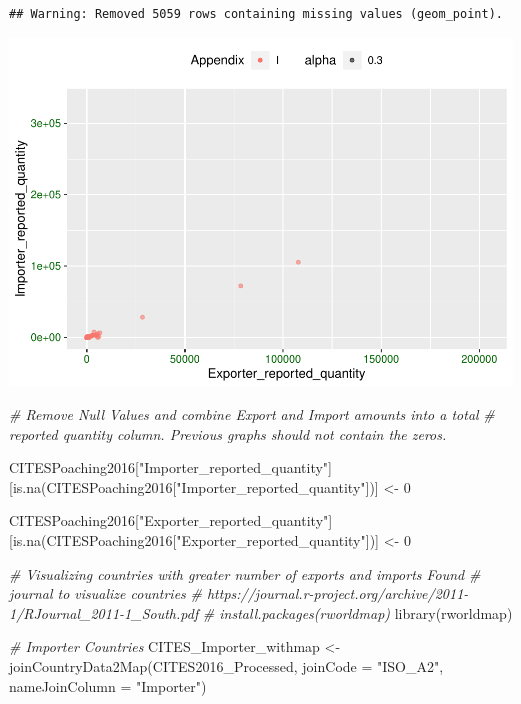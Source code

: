 \documentclass[
  12pt,
]{article}
\newenvironment{Shaded}{\begin{snugshade}}{\end{snugshade}}
\newcommand{\AttributeTok}[1]{\textcolor[rgb]{0.77,0.63,0.00}{#1}}
\newcommand{\CommentTok}[1]{\textcolor[rgb]{0.56,0.35,0.01}{\textit{#1}}}
\newcommand{\DecValTok}[1]{\textcolor[rgb]{0.00,0.00,0.81}{#1}}
\newcommand{\FunctionTok}[1]{\textcolor[rgb]{0.00,0.00,0.00}{#1}}
\newcommand{\NormalTok}[1]{#1}
\newcommand{\OtherTok}[1]{\textcolor[rgb]{0.56,0.35,0.01}{#1}}
\newcommand{\StringTok}[1]{\textcolor[rgb]{0.31,0.60,0.02}{#1}}
\begin{document}
\begin{verbatim}
## Warning: Removed 5059 rows containing missing values (geom_point).
\end{verbatim}

\includegraphics{Wood_ENV872_Project_files/figure-latex/unnamed-chunk-4-4.pdf}

\begin{Shaded}
\begin{Highlighting}[]
\CommentTok{\# Remove Null Values and combine Export and Import amounts into a total}
\CommentTok{\# reported quantity column. Previous graphs should not contain the zeros.}

\NormalTok{CITESPoaching2016[}\StringTok{"Importer\_reported\_quantity"}\NormalTok{][}\FunctionTok{is.na}\NormalTok{(CITESPoaching2016[}\StringTok{"Importer\_reported\_quantity"}\NormalTok{])] }\OtherTok{\textless{}{-}} \DecValTok{0}

\NormalTok{CITESPoaching2016[}\StringTok{"Exporter\_reported\_quantity"}\NormalTok{][}\FunctionTok{is.na}\NormalTok{(CITESPoaching2016[}\StringTok{"Exporter\_reported\_quantity"}\NormalTok{])] }\OtherTok{\textless{}{-}} \DecValTok{0}


\CommentTok{\# Visualizing countries with greater number of exports and imports Found}
\CommentTok{\# journal to visualize countries}
\CommentTok{\# https://journal.r{-}project.org/archive/2011{-}1/RJournal\_2011{-}1\_South.pdf}
\CommentTok{\# install.packages(\textquotesingle{}rworldmap\textquotesingle{})}
\FunctionTok{library}\NormalTok{(rworldmap)}

\CommentTok{\# Importer Countries}
\NormalTok{CITES\_Importer\_withmap }\OtherTok{\textless{}{-}} \FunctionTok{joinCountryData2Map}\NormalTok{(CITES2016\_Processed, }\AttributeTok{joinCode =} \StringTok{"ISO\_A2"}\NormalTok{,}
    \AttributeTok{nameJoinColumn =} \StringTok{"Importer"}\NormalTok{)}
\end{Highlighting}
\end{Shaded}
\end{document}
